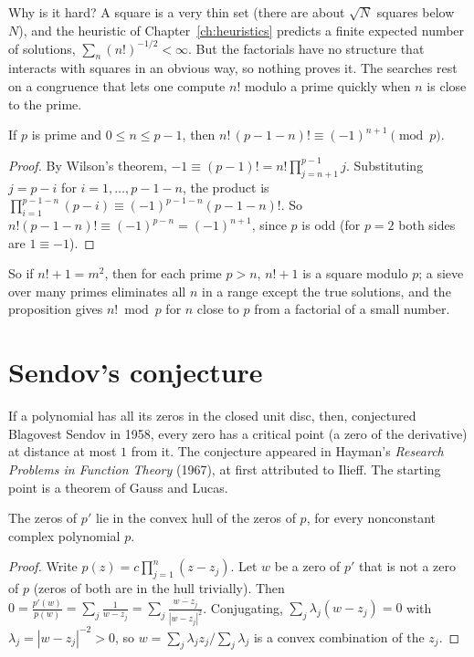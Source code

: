 Why is it hard? A square is a very thin set (there are about $\sqrt N$ squares below $N$), and the heuristic of Chapter~\ref{ch:heuristics} predicts a finite expected number of solutions, $\sum_n(n!)^{-1/2}<\infty$. But the factorials have no structure that interacts with squares in an obvious way, so nothing proves it. The searches rest on a congruence that lets one compute $n!$ modulo a prime quickly when $n$ is close to the prime.

\begin{proposition}\label{prop:wilsonflip}
If $p$ is prime and $0\le n\le p-1$, then $n!\,(p-1-n)!\equiv(-1)^{n+1}\pmod p$.
\end{proposition}

\begin{proof}
By Wilson's theorem, $-1\equiv(p-1)!=n!\prod_{j=n+1}^{p-1}j$. Substituting $j=p-i$ for $i=1,\dots,p-1-n$, the product is $\prod_{i=1}^{p-1-n}(p-i)\equiv(-1)^{p-1-n}(p-1-n)!$. So $n!(p-1-n)!\equiv(-1)^{p-n}=(-1)^{n+1}$, since $p$ is odd (for $p=2$ both sides are $1\equiv-1$).
\end{proof}

So if $n!+1=m^2$, then for each prime $p>n$, $n!+1$ is a square modulo $p$; a sieve over many primes eliminates all $n$ in a range except the true solutions, and the proposition gives $n!\bmod p$ for $n$ close to $p$ from a factorial of a small number.

\section{Sendov's conjecture}

If a polynomial has all its zeros in the closed unit disc, then, conjectured Blagovest Sendov in 1958, every zero has a critical point (a zero of the derivative) at distance at most $1$ from it. The conjecture appeared in Hayman's \emph{Research Problems in Function Theory} (1967), at first attributed to Ilieff. The starting point is a theorem of Gauss and Lucas.

\begin{proposition}\label{prop:gausslucas}
The zeros of $p'$ lie in the convex hull of the zeros of $p$, for every nonconstant complex polynomial $p$.
\end{proposition}

\begin{proof}
Write $p(z)=c\prod_{j=1}^n(z-z_j)$. Let $w$ be a zero of $p'$ that is not a zero of $p$ (zeros of both are in the hull trivially). Then $0=\frac{p'(w)}{p(w)}=\sum_j\frac1{w-z_j}=\sum_j\frac{\overline{w-z_j}}{|w-z_j|^2}$. Conjugating, $\sum_j\lambda_j(w-z_j)=0$ with $\lambda_j=|w-z_j|^{-2}>0$, so $w=\sum_j\lambda_jz_j/\sum_j\lambda_j$ is a convex combination of the $z_j$.
\end{proof}

